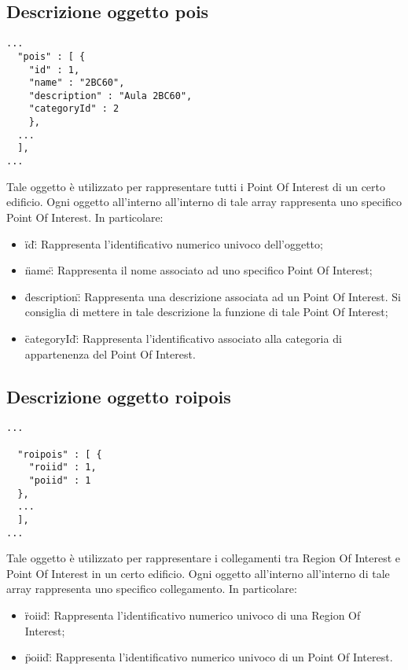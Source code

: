 \documentclass[../ManualeSviluppatore.tex]{subfiles}
\begin{document}
		\subsection{Descrizione oggetto pois}
		\begin{lstlisting}
...
  "pois" : [ {
	"id" : 1,
	"name" : "2BC60",
	"description" : "Aula 2BC60",
	"categoryId" : 2
    }, 
  ...
  ],
...
		\end{lstlisting}
		Tale oggetto è utilizzato per rappresentare tutti i Point Of Interest di un certo edificio. Ogni oggetto all'interno all'interno di tale array rappresenta uno specifico Point Of Interest. In particolare:
		\begin{itemize}
			\item \"id\": Rappresenta l'identificativo numerico univoco dell'oggetto;
			\item \"name\": Rappresenta il nome associato ad uno specifico Point Of Interest;
			\item \"description\": Rappresenta una descrizione associata ad un Point Of Interest. Si consiglia di mettere in tale descrizione la funzione di tale Point Of Interest;
			\item \"categoryId\": Rappresenta l'identificativo associato alla categoria di appartenenza del Point Of Interest.
		\end{itemize}
	\subsection{Descrizione oggetto roipois}
		\begin{lstlisting}
...
  
  "roipois" : [ {
	"roiid" : 1,
	"poiid" : 1
  },  
  ...
  ],
...
		\end{lstlisting}
		Tale oggetto è utilizzato per rappresentare i collegamenti tra Region Of Interest e Point Of Interest in un certo edificio. Ogni oggetto all'interno all'interno di tale array rappresenta uno specifico collegamento. In particolare:
		\begin{itemize}
			\item \"roiid\": Rappresenta l'identificativo numerico univoco di una Region Of Interest;
			\item \"poiid\": Rappresenta l'identificativo numerico univoco di un Point Of Interest.
		\end{itemize}
\end{document}
